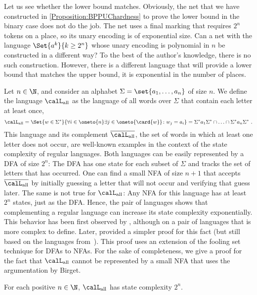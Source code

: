 \documentclass[../../diss.tex]{subfiles}
\begin{document}
Let us see whether the lower bound matches.
Obviously, the net that we have constructed in \cref{Proposition:BPPUChardness} to prove the lower bound in the binary case does not do the job.
The net uses a final marking that requires $2^n$ tokens on a place, so its unary encoding is of exponential size.
Can a net with the language $\Set{a^k}{k \geq 2^n}$ whose unary encoding is polynomial in $n$ be constructed in a different way?
To the best of the author's knowledge, there is no such construction.
However, there is a different language that will provide a lower bound that matches the upper bound, \ie it is exponential in the number of places.

Let $n \in \N$, and consider an alphabet $\Sigma = \set{a_1, \ldots, a_n}$ of size $n$.
We define the language $\calL_{\text{all}}$ as the language of all words over $\Sigma$ that contain each letter at least once,
\[
    \calL_{\text{all}} = \Set{ w \in \Sigma^*}{ \forall i \in \oneto{n} \exists j \in \oneto{\card{w}} \colon w_j = a_i } = \Sigma^*a_1\Sigma^* \cap \ldots \cap \Sigma^* a_n \Sigma^*
    \ .
\]
This language and its complement $\overline{\calL_{\text{all}}}$, the set of words in which at least one letter does not occur, are well-known examples in the context of the state complexity of regular languages.
Both languages can be easily represented by a DFA of size $2^n$: The DFA has one state for each subset of $\Sigma$ and tracks the set of letters that has occurred.
One can find a small NFA of size $n+1$ that accepts $\overline{\calL_{\text{all}}}$ by initially guessing a letter that will not occur and verifying that guess later.
The same is not true for $\calL_{\text{all}}$: Any NFA for this language has at least $2^n$ states, just as the DFA.\@
Hence, the pair of languages shows that complementing a regular language can increase its state complexity exponentially.
This behavior has been first observed by , although on a pair of languages that is more complex to define.
Later,  provided a simpler proof for this fact (but still based on the languages from~\cite{SakodaS78}).
This proof uses an extension of the fooling set technique for DFAs to NFAs.
For the sake of completeness, we give a proof for the fact that $\calL_{\text{all}}$ cannot be represented by a small NFA that uses the argumentation by Birget.

\begin{lemma}
    For each positive $n \in \N$, $\calL_{\text{all}}$ has state complexity $2^n$.
\end{lemma}
\end{document}
